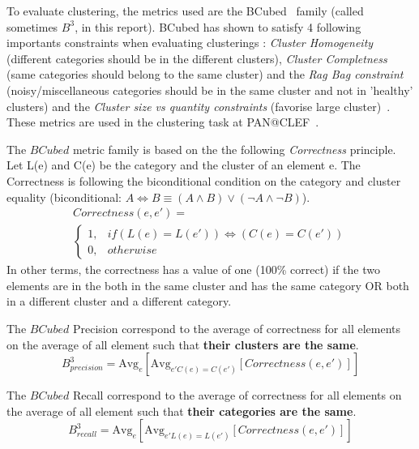 To evaluate clustering, the metrics used are the BCubed~\cite{bcubed} family (called sometimes $B^3$, in this report).
BCubed has shown to satisfy 4 following importants constraints when evaluating clusterings : \textit{Cluster Homogeneity} (different categories should be in the different clusters), \textit{Cluster Completness} (same categories should belong to the same cluster) and the \textit{Rag Bag constraint} (noisy/miscellaneous categories should be in the same cluster and not in 'healthy' clusters) and the \textit{Cluster size vs quantity constraints} (favorise large cluster)~\cite{bcubed}.
These metrics are used in the clustering task at PAN@CLEF~\cite{pan16}.

\begin{definition}
  The $BCubed$ metric family is based on the the following \textit{Correctness} principle.
  Let L(e) and C(e) be the category and the cluster of an element e.
  The Correctness is following the biconditional condition on the category and cluster equality (biconditional: $A \Longleftrightarrow B \equiv (A \land B) \lor (\neg A \land \neg B)$).
  \begin{gather*}
    Correctness(e, e') = \\
    \begin{cases}
      1, & if (L(e) = L(e')) \Longleftrightarrow (C(e) = C(e'))\\
      0, & otherwise
    \end{cases}
  \end{gather*}
  In other terms, the correctness has a value of one (100\% correct) if the two elements are in the both in the same cluster and has the same category OR both in a different cluster and a different category.
\end{definition}

\begin{definition}
  The $BCubed$ Precision correspond to the average of correctness for all elements on the average of all element such that \textbf{their clusters are the same}.
  \begin{equation}
    B^3_{precision} = \text{Avg}_{e}[\text{Avg}_{e' C(e)=C(e')}[Correctness(e, e')]]
  \end{equation}
\end{definition}

\begin{definition}
  The $BCubed$ Recall correspond to the average of correctness for all elements on the average of all element such that \textbf{their categories are the same}.
  \begin{equation}
    B^3_{recall} = \text{Avg}_{e}[\text{Avg}_{e' L(e)=L(e')}[Correctness(e, e')]]
  \end{equation}
\end{definition}

